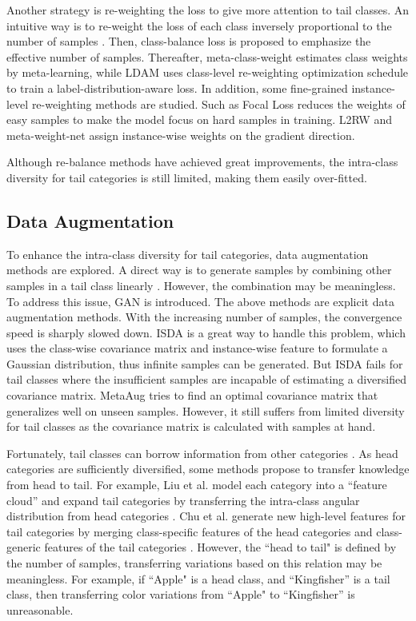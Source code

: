 \documentclass[letterpaper]{article} \usepackage{aaai22}  \usepackage{times}  \usepackage{helvet}  \usepackage{courier}  \usepackage[hyphens]{url}  \usepackage{graphicx} \usepackage{bm}
\begin{document}
Another strategy is re-weighting the loss to give more attention to tail classes. An intuitive way is to re-weight the loss of each class inversely proportional to the number of samples \cite{huang2016learning}. Then, class-balance loss \cite{cui2019class} is proposed to emphasize the effective number of samples. Thereafter, meta-class-weight \cite{jamal2020rethinking} estimates class weights by meta-learning, while LDAM \cite{cao2019learning} uses class-level re-weighting optimization schedule to train a label-distribution-aware loss.
In addition, some fine-grained instance-level re-weighting methods are studied. Such as Focal Loss \cite{lin2017focal} reduces the weights of easy samples to make the model focus on hard samples in training. L2RW \cite{ren2018learning} and meta-weight-net \cite{shu2019meta} assign instance-wise weights on the gradient direction. 
	
	Although re-balance methods have achieved great improvements, the intra-class diversity for tail categories is still limited, making them easily over-fitted.
	
	\subsection{Data Augmentation}
	To enhance the intra-class diversity for tail categories, data augmentation methods are explored. A direct way is to generate samples by combining other samples in a tail class linearly \cite{he2008adaptive,zhang2017mixup}. However, the combination may be meaningless. To address this issue, GAN \cite{bowles2018gan} is introduced. The above methods are explicit data augmentation methods. With the increasing number of samples, the convergence speed is sharply slowed down. ISDA \cite{wang2019implicit} is a great way to handle this problem, which uses the class-wise covariance matrix and instance-wise feature to formulate a Gaussian distribution, thus infinite samples can be generated. But ISDA fails for tail classes where the insufficient samples are incapable of estimating a diversified covariance matrix. MetaAug \cite{li2021metasaug} tries to find an optimal covariance matrix that generalizes well on unseen samples. However, it still suffers from limited diversity for tail classes as the covariance matrix is calculated with samples at hand.
	
	Fortunately, tail classes can borrow information from other categories \cite{chu2020feature,liu2020deep,xiao2021does}. As head categories are sufficiently diversified, some methods propose to transfer knowledge from head to tail. For example, Liu et al. model each category into a ``feature cloud” and expand tail categories by transferring the intra-class angular distribution from head categories \cite{liu2020deep}. Chu et al. generate new high-level features for tail categories by merging class-specific features of the head categories and class-generic features of the tail categories \cite{chu2020feature}. However, the ``head to tail" is defined by the number of samples, transferring variations based on this relation may be meaningless. For example, if ``Apple"  is a head class, and ``Kingfisher'' is a tail class, then transferring color variations from ``Apple" to ``Kingfisher'' is unreasonable.
	
\end{document}
